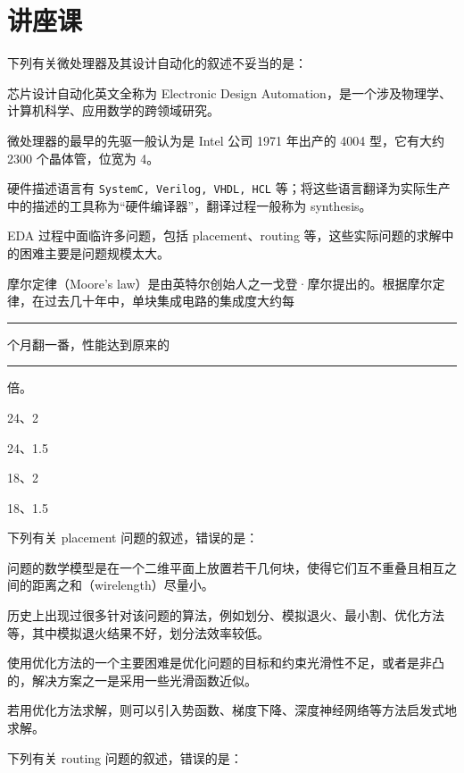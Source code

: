 \chapter{讲座课}
    \begin{problems}
        \pro 下列有关微处理器及其设计自动化的叙述不妥当的是：
        \begin{choices}
            \item 芯片设计自动化英文全称为 Electronic Design Automation，是一个涉及物理学、计算机科学、应用数学的跨领域研究。
            \item 微处理器的最早的先驱一般认为是 Intel 公司 1971 年出产的 4004 型，它有大约 2300 个晶体管，位宽为 4。
            \item 硬件描述语言有 \verb|SystemC, Verilog, VHDL, HCL| 等；将这些语言翻译为实际生产中的描述的工具称为“硬件编译器”，翻译过程一般称为 synthesis。
            \item EDA 过程中面临许多问题，包括 placement、routing 等，这些实际问题的求解中的困难主要是问题规模太大。
        \end{choices}
        \pro 摩尔定律（Moore's law）是由英特尔创始人之一戈登·摩尔提出的。根据摩尔定律，在过去几十年中，单块集成电路的集成度大约每 \rule{1cm}{0.25mm} 个月翻一番，性能达到原来的 \rule{1cm}{0.25mm} 倍。
        \begin{choices}
            \item 24、2
            \item 24、1.5
            \item 18、2
            \item 18、1.5
        \end{choices}
        \pro 下列有关 placement 问题的叙述，错误的是：
        \begin{choices}
            \item 问题的数学模型是在一个二维平面上放置若干几何块，使得它们互不重叠且相互之间的距离之和（wirelength）尽量小。
            \item 历史上出现过很多针对该问题的算法，例如划分、模拟退火、最小割、优化方法等，其中模拟退火结果不好，划分法效率较低。
            \item 使用优化方法的一个主要困难是优化问题的目标和约束光滑性不足，或者是非凸的，解决方案之一是采用一些光滑函数近似。
            \item 若用优化方法求解，则可以引入势函数、梯度下降、深度神经网络等方法启发式地求解。
        \end{choices}
        \pro 下列有关 routing 问题的叙述，错误的是：
        \begin{choices}

\end{choices}
\end{problems}
